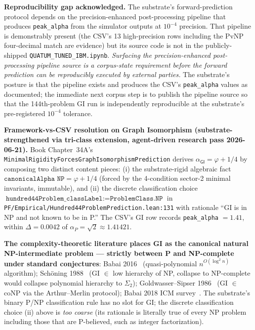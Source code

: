 \documentclass[11pt,a4paper]{amsart}
\theoremstyle{plain}
\theoremstyle{definition}
\begin{document}
\textbf{Reproducibility gap acknowledged.} The substrate's forward-prediction protocol depends on the precision-enhanced post-processing pipeline that produces \texttt{peak\_alpha} from the simulator outputs at $10^{-4}$ precision. That pipeline is demonstrably present (the CSV's 13 high-precision rows including the PvNP four-decimal match are evidence) but its source code is not in the publicly-shipped \texttt{QUATUM\_TUNED\_IBM.ipynb}. \emph{Surfacing the precision-enhanced post-processing pipeline source is a corpus-state requirement before the forward prediction can be reproducibly executed by external parties.} The substrate's posture is that the pipeline exists and produces the CSV's \texttt{peak\_alpha} values as documented; the immediate next corpus step is to publish the pipeline source so that the 144th-problem GI run is independently reproducible at the substrate's pre-registered $10^{-4}$ tolerance.

\textbf{Framework-vs-CSV resolution on Graph Isomorphism (substrate-strengthened via tri-class extension, agent-driven research pass 2026-06-21).} Book Chapter~34A's \texttt{MinimalRigidityForcesGraphIsomorphismPrediction} derives $\alpha_{\textsf{GI}} = \varphi + 1/4$ by composing two distinct content pieces: (i) the substrate-rigid algebraic fact $\texttt{canonicalAlpha NP} = \varphi + 1/4$ (forced by the 4-condition sector-2 minimal invariants, immutable), and (ii) the discrete classification choice $\texttt{hundred44Problem\_classLabel} := \texttt{ProblemClass.NP}$ in \texttt{PF/Empirical/Hundred44ProblemPrediction.lean:131} with rationale ``GI is in NP and not known to be in P.'' The CSV's GI row records \texttt{peak\_alpha} $= 1.41$, within $\Delta = 0.0042$ of $\alpha_P = \sqrt{2} \approx 1.41421$.

\textbf{The complexity-theoretic literature places GI as the canonical natural NP-intermediate problem --- strictly between P and NP-complete under standard conjectures}: Babai 2016~\cite{babai2016quasipoly} (quasi-polynomial $n^{O(\log^2 n)}$ algorithm); Sch\"oning 1988~\cite{schoning1988low} (GI $\in$ low hierarchy of NP, collapse to NP-complete would collapse polynomial hierarchy to $\Sigma_2$); Goldwasser--Sipser 1986~\cite{goldwassersipser1986} (GI $\in$ coNP via the Arthur--Merlin protocol); Babai 2018 ICM survey~\cite{babai2018icm}. The substrate's binary P/NP classification rule has no slot for GI; the discrete classification choice (ii) above is \emph{too coarse} (its rationale is literally true of every NP problem including those that are P-believed, such as integer factorization).
\end{document}
